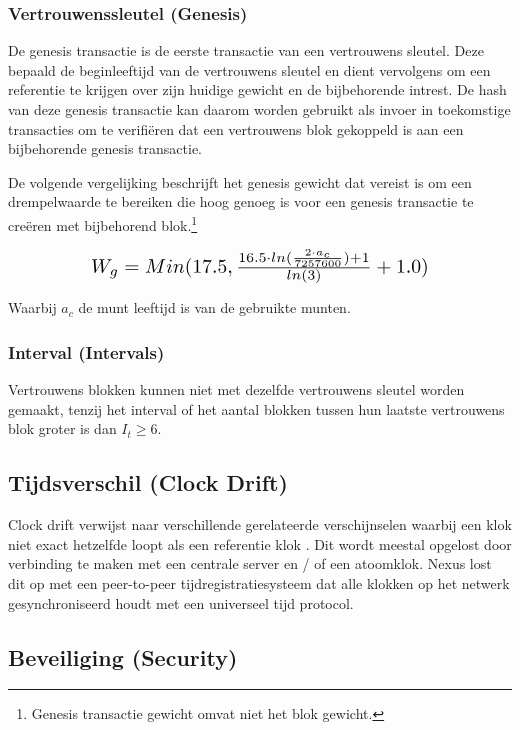 \documentclass[11pt]{article}
\begin{document}
\subsubsection{Vertrouwenssleutel (Genesis)}

De genesis transactie is de eerste transactie van een vertrouwens sleutel. Deze bepaald de beginleeftijd van de vertrouwens sleutel en dient vervolgens om een ​​referentie te krijgen over zijn huidige gewicht en de bijbehorende intrest. De hash van deze genesis transactie kan daarom worden gebruikt als invoer in toekomstige transacties om te verifi\"eren dat een vertrouwens blok gekoppeld is aan een bijbehorende genesis transactie.

\noindent De volgende vergelijking beschrijft het genesis gewicht dat vereist is om een ​​drempelwaarde te bereiken die hoog genoeg is voor een genesis transactie te cre\"eren met bijbehorend blok.\footnote{Genesis transactie gewicht omvat niet het blok gewicht.}

\begin{equation}
\resizebox{.70\hsize}{!}{$
W_{g} = Min(17.5, \frac{16.5 \cdot ln(\frac{2 \cdot a_{c}}{7257600}) + 1}{ln(3)} + 1.0)
$}
\end{equation}

\noindent Waarbij $a_c$ de munt leeftijd is van de gebruikte munten.

\subsubsection{Interval (Intervals)}
 
Vertrouwens blokken kunnen niet met dezelfde vertrouwens sleutel worden gemaakt, tenzij het interval of het aantal blokken tussen hun laatste vertrouwens blok groter is dan $I_{t} \geq 6$.

\subsection{Tijdsverschil (Clock Drift)}

Clock drift verwijst naar verschillende gerelateerde verschijnselen waarbij een klok niet exact hetzelfde loopt als een referentie klok \cite{wikiclockdrift}.
Dit wordt meestal opgelost door verbinding te maken met een centrale server en / of een atoomklok. Nexus lost dit op met een peer-to-peer tijdregistratiesysteem dat alle klokken op het netwerk gesynchroniseerd houdt met een universeel tijd protocol.


\subsection{Beveiliging (Security)}
\end{document}
